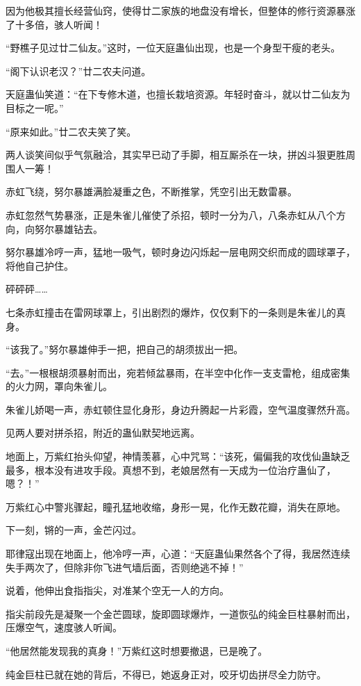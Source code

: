 \begin{this_body}
因为他极其擅长经营仙窍，使得廿二家族的地盘没有增长，但整体的修行资源暴涨了十多倍，骇人听闻！

“野樵子见过廿二仙友。”这时，一位天庭蛊仙出现，也是一个身型干瘦的老头。

“阁下认识老汉？”廿二农夫问道。

天庭蛊仙笑道：“在下专修木道，也擅长栽培资源。年轻时奋斗，就以廿二仙友为目标之一呢。”

“原来如此。”廿二农夫笑了笑。

两人谈笑间似乎气氛融洽，其实早已动了手脚，相互厮杀在一块，拼凶斗狠更胜周围人一筹！

赤虹飞绕，努尔暴雄满脸凝重之色，不断推掌，凭空引出无数雷暴。

赤虹忽然气势暴涨，正是朱雀儿催使了杀招，顿时一分为八，八条赤虹从八个方向，向努尔暴雄钻去。

努尔暴雄冷哼一声，猛地一吸气，顿时身边闪烁起一层电网交织而成的圆球罩子，将他自己护住。

砰砰砰……

七条赤虹撞击在雷网球罩上，引出剧烈的爆炸，仅仅剩下的一条则是朱雀儿的真身。

“该我了。”努尔暴雄伸手一把，把自己的胡须拔出一把。

“去。”一根根胡须暴射而出，宛若倾盆暴雨，在半空中化作一支支雷枪，组成密集的火力网，罩向朱雀儿。

朱雀儿娇喝一声，赤虹顿住显化身形，身边升腾起一片彩霞，空气温度骤然升高。

见两人要对拼杀招，附近的蛊仙默契地远离。

地面上，万紫红抬头仰望，神情羡慕，心中咒骂：“该死，偏偏我的攻伐仙蛊缺乏最多，根本没有进攻手段。真想不到，老娘居然有一天成为一位治疗蛊仙了，嗯？！”

万紫红心中警兆骤起，瞳孔猛地收缩，身形一晃，化作无数花瓣，消失在原地。

下一刻，锵的一声，金芒闪过。

耶律寇出现在地面上，他冷哼一声，心道：“天庭蛊仙果然各个了得，我居然连续失手两次了，但除非你飞进气墙后面，否则绝逃不掉！”

说着，他伸出食指指尖，对准某个空无一人的方向。

指尖前段先是凝聚一个金芒圆球，旋即圆球爆炸，一道恢弘的纯金巨柱暴射而出，压爆空气，速度骇人听闻。

“他居然能发现我的真身！”万紫红这时想要撤退，已是晚了。

纯金巨柱已就在她的背后，不得已，她返身正对，咬牙切齿拼尽全力防守。


\end{this_body}
